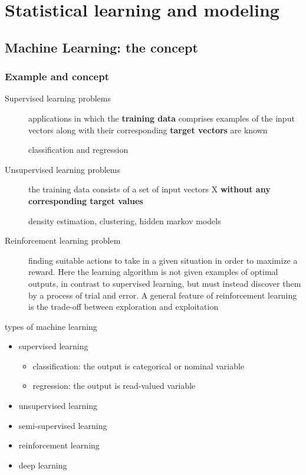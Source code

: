 \documentclass[11pt]{article}
\begin{document}
\section{Statistical learning and modeling}
\label{sec:org09fe672}
\subsection{Machine Learning: the concept}
\label{sec:orgb167581}
\subsubsection{Example and concept}
\label{sec:orga191cc8}
\begin{description}
\item[{Supervised learning problems}] applications in which the \textbf{training data} comprises examples of the input
vectors along with their corresponding \textbf{target vectors} are known

classification and regression
\item[{Unsupervised learning problems}] the training data consists of a set of input vectors X \textbf{without any
corresponding target values}

density estimation, clustering, hidden markov models
\item[{Reinforcement learning problem}] finding suitable actions to take in a given situation in order to
maximize a reward. Here the learning algorithm is not given examples of
optimal outputs, in contrast to supervised learning, but must instead
discover them by a process of trial and error. A general feature of
reinforcement learning is the trade-off between exploration and exploitation
\end{description}

types of machine learning
\begin{itemize}
\item supervised learning
\begin{itemize}
\item classification: the output is categorical or nominal variable
\item regression: the output is read-valued variable
\end{itemize}
\item unsupervised learning
\item semi-supervised learning
\item reinforcement learning
\item deep learning
\end{itemize}
\end{document}
